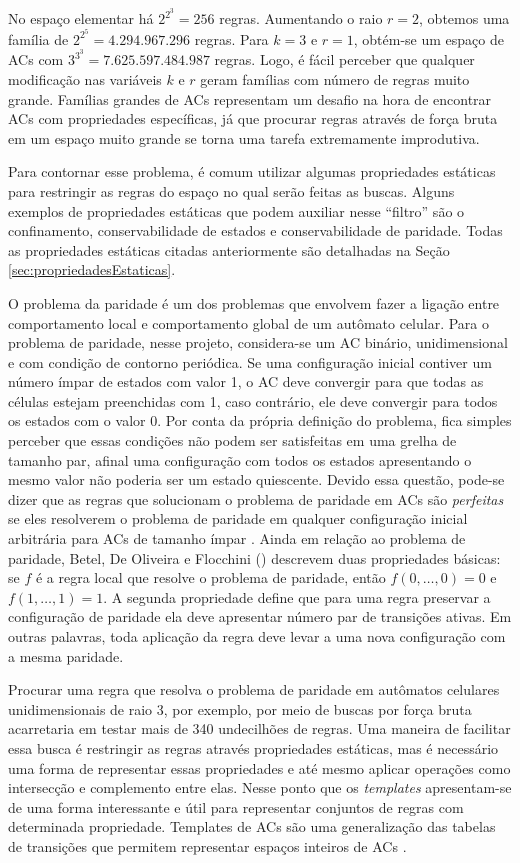 No espaço elementar há $2^{2^{3}} = 256$ regras. Aumentando o raio $r=2$, obtemos uma família de $2^{2^{5}} = 4.294.967.296$ regras. Para $k=3$ e $r=1$, obtém-se um espaço de ACs com $3^{3^{3}} = 7.625.597.484.987$ regras. Logo, é fácil perceber que qualquer modificação nas variáveis $k$ e $r$ geram famílias com número de regras muito grande. Famílias grandes de ACs representam um desafio na hora de encontrar ACs com propriedades específicas, já que procurar regras através de força bruta em um espaço muito grande se torna uma tarefa extremamente improdutiva.

Para contornar esse problema, é comum utilizar algumas propriedades estáticas para restringir as regras do espaço no qual serão feitas as buscas. Alguns exemplos de propriedades estáticas que podem auxiliar nesse ``filtro'' são o confinamento, conservabilidade de estados e conservabilidade de paridade. Todas as propriedades estáticas citadas anteriormente são detalhadas na Seção \ref{sec:propriedadesEstaticas}.

O problema da paridade é um dos problemas que envolvem fazer a ligação entre comportamento local e comportamento global de um autômato celular. Para o problema de paridade, nesse projeto, considera-se um AC binário, unidimensional e com condição de contorno periódica. Se uma configuração inicial contiver um número ímpar de estados com valor 1, o AC deve convergir para que todas as células estejam preenchidas com 1, caso contrário, ele deve convergir para todos os estados com o valor 0. Por conta da própria definição do problema, fica simples perceber que essas condições não podem ser satisfeitas em uma grelha de tamanho par, afinal uma configuração com todos os estados apresentando o mesmo valor não poderia ser um estado quiescente. Devido essa questão, pode-se dizer que as regras que solucionam o problema de paridade em ACs são \textit{perfeitas} se eles resolverem o problema de paridade em qualquer configuração inicial arbitrária para ACs de tamanho ímpar \cite{Betel2013}. Ainda em relação ao problema de paridade, Betel, De Oliveira e Flocchini (\citeyear{Betel2013}) descrevem duas propriedades básicas: se $f$ é a regra local que resolve o problema de paridade, então $f(0, \dots, 0) = 0$ e $f(1, \dots, 1) = 1$. A segunda propriedade define que para uma regra preservar a configuração de paridade ela deve apresentar número par de transições ativas. Em outras palavras, toda aplicação da regra deve levar a uma nova configuração com a mesma paridade.

Procurar uma regra que resolva o problema de paridade em autômatos celulares unidimensionais de raio 3, por exemplo, por meio de buscas por força bruta acarretaria em testar mais de 340 undecilhões de regras. Uma maneira de facilitar essa busca é restringir as regras através propriedades estáticas, mas é necessário uma forma de representar essas propriedades e até mesmo aplicar operações como intersecção e complemento entre elas. Nesse ponto que os \textit{templates} apresentam-se de uma forma interessante e útil para representar conjuntos de regras com determinada propriedade. Templates de ACs são uma generalização das tabelas de transições que permitem representar espaços inteiros de ACs \cite{Verardo2014}.